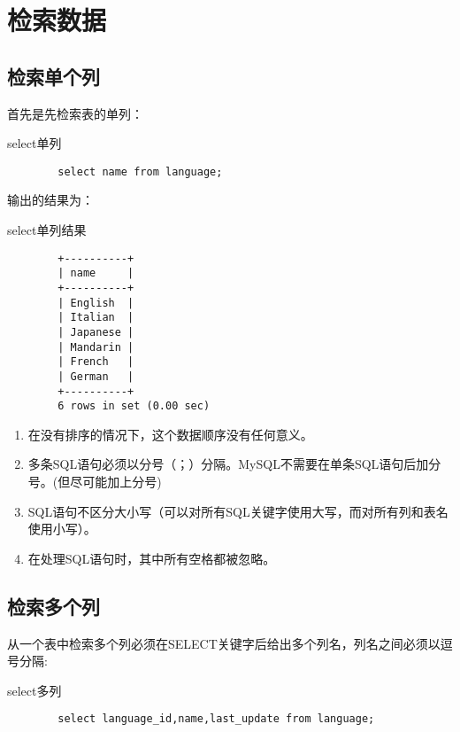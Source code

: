 \documentclass[UTF8]{article}
\begin{document}
\section{检索数据}
\subsection{检索单个列}
首先是先检索表的单列：
\begin{listing}[H]
	\caption{select单列}
	\label{code:selectcolumn}
	\begin{verbatim}
        select name from language;
\end{verbatim}
\end{listing}

输出的结果为：
\begin{listing}[H]
	\caption{select单列结果}
	\label{code:resultofselectcolumn}
	\begin{verbatim}
        +----------+
        | name     |
        +----------+
        | English  |
        | Italian  |
        | Japanese |
        | Mandarin |
        | French   |
        | German   |
        +----------+
        6 rows in set (0.00 sec)
\end{verbatim}
\end{listing}
\begin{orangebox}[frametitle={Tips 4.1}]
\begin{enumerate}
    \item 在没有排序的情况下，这个数据顺序没有任何意义。
    \item 多条SQL语句必须以分号（；）分隔。MySQL不需要在单条SQL语句后加分号。(但尽可能加上分号)
    \item SQL语句不区分大小写（可以对所有SQL关键字使用大写，而对所有列和表名使用小写）。
    \item 在处理SQL语句时，其中所有空格都被忽略。
\end{enumerate}
\end{orangebox}
\subsection{检索多个列}
从一个表中检索多个列必须在SELECT关键字后给出多个列名，列名之间必须以逗号分隔:
\begin{listing}[H]
	\caption{select多列}
	\label{code:selectcolumns}
	\begin{verbatim}
        select language_id,name,last_update from language;
\end{verbatim}
\end{listing}
\end{document}
